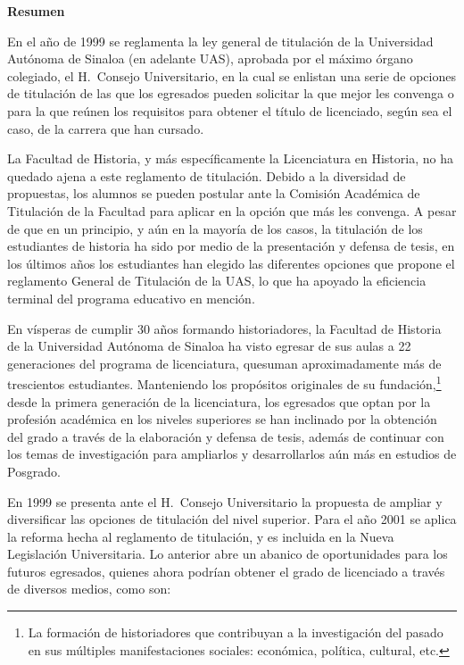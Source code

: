 \bigskip
\textbf{Resumen}
\enlargethispage{1\baselineskip}

En el año de 1999 se reglamenta la ley general de titulación de la
Universidad Autónoma de Sinaloa (en adelante UAS), aprobada por el máximo
órgano colegiado, el H.\ Consejo Universitario, en la cual se enlistan una
serie de opciones de titulación de las que los egresados pueden solicitar
la que mejor les convenga o para la que reúnen los requisitos para obtener
el título de licenciado, según sea el caso, de la carrera que han cursado. 

La Facultad de Historia, y más específicamente la Licenciatura en Historia, no
ha quedado ajena a este reglamento de titulación. Debido a la diversidad de
propuestas, los alumnos se pueden postular ante la Comisión Académica de
Titulación de la Facultad para aplicar en la opción que más les convenga. 
A pesar de que en un principio, y aún en la mayoría de los casos, la
titulación de los estudiantes de historia ha sido por medio de la
presentación y defensa de tesis, en los últimos años los estudiantes han
elegido las diferentes opciones que propone el reglamento General de
Titulación de la UAS, lo que ha apoyado la eficiencia terminal del programa
educativo en mención. 

En vísperas de cumplir 30 años formando historiadores, la Facultad de
Historia de la Universidad Autónoma de Sinaloa ha visto egresar de sus
aulas a 22 generaciones del programa de licenciatura, que\linebreak suman
aproximadamente más de trescientos  estudiantes. Manteniendo los propósitos
originales de su fundación,\footnote{La formación de historiadores que
contribuyan a la investigación del pasado en sus múltiples manifestaciones
sociales: económica, política, cultural, etc.} desde la primera generación
de la licenciatura, los egresados que optan por la profesión académica en
los niveles superiores se han inclinado por la obtención del grado a
través de la elaboración y defensa de tesis, además de continuar con los
temas de investigación para ampliarlos y desarrollarlos aún más en estudios
de Posgrado. 

En 1999 se presenta ante el H.\ Consejo Universitario la propuesta de ampliar
y diversificar las opciones de titulación del nivel superior. Para el año
2001 se aplica la reforma hecha al reglamento de titulación, y es incluida
en la Nueva Legislación Universitaria. Lo anterior abre un abanico de
oportunidades para los futuros egresados, quienes ahora podrían obtener 
el grado de licenciado a través de diversos medios, como son:
\enlargethispage{1\baselineskip}

